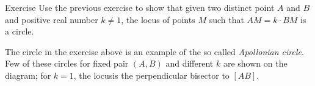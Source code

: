 \begin{thm}{Exercise}\label{ex:apolonnius}
Use the previous exercise to show that given two distinct point $A$ and $B$ and positive real number $k\ne1$,
the locus of points $M$ such that $AM=k\cdot BM$ is a circle. 
\end{thm}

The circle in the exercise above is an example of the so called \emph{Apollonian circle}.
Few of these circles for fixed pair $(A,B)$ and different $k$ are shown on the diagram; for $k=1$, the locusis the perpendicular bisector to $[AB]$.











